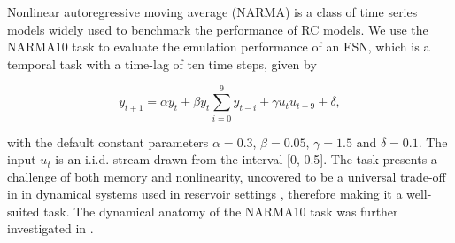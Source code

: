 Nonlinear autoregressive moving average (NARMA) \cite{atiya_new_2000} is a class
of time series models widely used to benchmark the performance of RC models. We
use the NARMA10 task to evaluate the emulation performance of an ESN, which is a
temporal task with a time-lag of ten time steps, given by


\begin{equation}
  y_{t+1} = \alpha y_{t} +
  \beta y_{t} \sum_{i=0}^{9}y_{t-i} +
  \gamma u_{t}u_{t-9} +
  \delta,
  \label{narma}
\end{equation}

\noindent with the default constant parameters $\alpha = 0.3$, $\beta = 0.05$,
$\gamma = 1.5$ and $\delta = 0.1$. The input $u_{t}$ is an i.i.d. stream drawn
from the interval [0, 0.5]. The task presents a challenge of both memory and
nonlinearity, uncovered to be a universal trade-off in in dynamical systems used
in reservoir settings \cite{dambre_information_2012, verstraeten_memory_2010},
therefore making it a well-suited task. The dynamical anatomy of the NARMA10
task was further investigated in \cite{kubota_dynamical_2019}.



